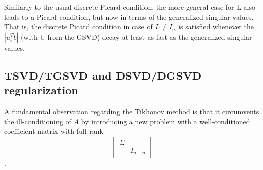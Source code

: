 \documentclass{article}
\begin{document}
	Similarly to the usual discrete Picard condition, the more general case for L also leads to a Picard
	condition, but now in terms of the generalized singular values. That is, the discrete Picard condition
	in case of $L \neq I_n$ is satisfied whenever the $|u^T_i b|$ (with U from the GSVD) decay at least as fast as
	the generalized singular values.
	
	\subsection{TSVD/TGSVD and DSVD/DGSVD regularization}
	A fundamental observation regarding the Tikhonov method is that it circumvents the ill-conditioning of $A$ by introducing a new problem with a well-conditioned coefficient matrix with full rank 
	\begin{equation*}
		\begin{bmatrix}
			\Sigma&\\&I_{n-p}
		\end{bmatrix}
	\end{equation*}.
	
\end{document}
